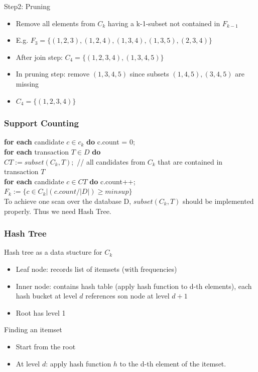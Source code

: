 \documentclass{article}
\newcommand\tab[1][1cm]{\hspace*{#1}}
\begin{document}
Step2: Pruning
\begin{itemize}
  \item Remove all elements from $C_k$ having a k-1-subset not contained in $F_{k-1}$
  \item E.g. $F_3 = \{(1,2,3), (1,2,4), (1,3,4), (1,3,5), (2,3,4)\}$
  \item After join step: $C_4 = \{(1,2,3,4), (1,3,4,5)\}$
  \item In pruning step: remove $(1,3,4,5)$ since subsets $(1,4,5), (3,4,5)$ are missing
  \item $C_4 = \{(1,2,3,4)\}$
\end{itemize}

\subsubsection{Support Counting}
\textbf{for each} candidate $c \in c_k$ \textbf{do} c.count = 0; \\
\textbf{for each} transaction $T \in D$ \textbf{do} \\
\tab $CT := subset(C_k, T);$ // all candidates from $C_k$ that are contained in transaction $T$ \\
\tab \textbf{for each} candidate $c \in CT$ \textbf{do} c.count++; \\
$F_k := \{c \in C_k | (c.count / |D|) \ge minsup\}$\\

To achieve one scan over the database D, $subset(C_k, T)$ should be implemented properly. Thus we need Hash Tree.

\subsubsection{Hash Tree}
Hash tree as a data stucture for $C_k$
\begin{itemize}
  \item Leaf node: records list of itemsets (with frequencies)
  \item Inner node: contains hash table (apply hash function to d-th elements), each hash bucket at level $d$ references son node at level $d+1$
  \item Root has level 1
\end{itemize}

Finding an itemset
\begin{itemize}
  \item Start from the root
  \item At level $d$: apply hash function $h$ to the d-th element of the itemset.
\end{itemize}
\end{document}
